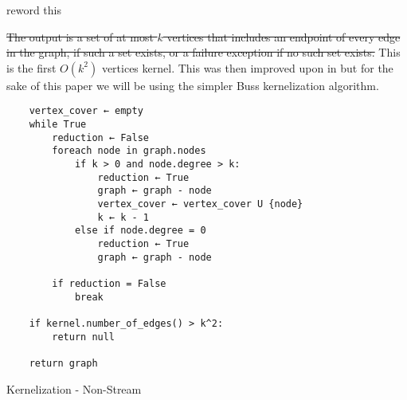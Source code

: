 reword this

\sout{The output is a set of at most \(k\) vertices that includes an
    endpoint of every edge in the graph, if such a set exists, or a failure
    exception if no such set exists.} This is the first \(O(k^2)\)
vertices kernel. This was then improved upon in
\cite{balasubramanian1998improved} but for the sake of this paper we will
be using the simpler Buss kernelization algorithm.

\begin{verbatim}
    vertex_cover ← empty
    while True
        reduction ← False
        foreach node in graph.nodes
            if k > 0 and node.degree > k:
                reduction ← True
                graph ← graph - node
                vertex_cover ← vertex_cover U {node}
                k ← k - 1
            else if node.degree = 0
                reduction ← True
                graph ← graph - node

        if reduction = False
            break

    if kernel.number_of_edges() > k^2:
        return null

    return graph
\end{verbatim}

\begin{algorithm}[H]
    \caption{Kernelization - Non-Stream}
    \DontPrintSemicolon

\end{algorithm}

